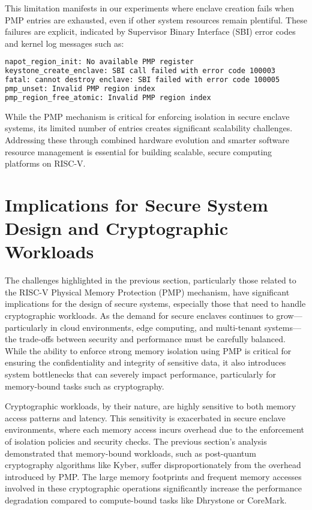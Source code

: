 This limitation manifests in our experiments where enclave creation fails when PMP entries are exhausted, even if other system resources remain plentiful. These failures are explicit, indicated by Supervisor Binary Interface (SBI) error codes and kernel log messages such as:

\begin{lstlisting}[language=bash,caption={Error messages during enclave creation and destruction}]
napot_region_init: No available PMP register
keystone_create_enclave: SBI call failed with error code 100003
fatal: cannot destroy enclave: SBI failed with error code 100005
pmp_unset: Invalid PMP region index
pmp_region_free_atomic: Invalid PMP region index
\end{lstlisting}

While the PMP mechanism is critical for enforcing isolation in secure enclave systems, its limited number of entries creates significant scalability challenges. Addressing these through combined hardware evolution and smarter software resource management is essential for building scalable, secure computing platforms on RISC-V.

\section{Implications for Secure System Design and Cryptographic Workloads}
\label{sec:implications}

The challenges highlighted in the previous section, particularly those related to the RISC-V Physical Memory Protection (PMP) mechanism, have significant implications for the design of secure systems, especially those that need to handle cryptographic workloads. As the demand for secure enclaves continues to grow—particularly in cloud environments, edge computing, and multi-tenant systems—the trade-offs between security and performance must be carefully balanced. While the ability to enforce strong memory isolation using PMP is critical for ensuring the confidentiality and integrity of sensitive data, it also introduces system bottlenecks that can severely impact performance, particularly for memory-bound tasks such as cryptography.

Cryptographic workloads, by their nature, are highly sensitive to both memory access patterns and latency. This sensitivity is exacerbated in secure enclave environments, where each memory access incurs overhead due to the enforcement of isolation policies and security checks. The previous section's analysis demonstrated that memory-bound workloads, such as post-quantum cryptography algorithms like Kyber, suffer disproportionately from the overhead introduced by PMP. The large memory footprints and frequent memory accesses involved in these cryptographic operations significantly increase the performance degradation compared to compute-bound tasks like Dhrystone or CoreMark.

